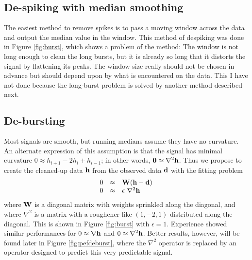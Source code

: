\subsection{De-spiking with median smoothing}

The easiest method to remove spikes is to pass a moving window
across the data and output the median value in the window.
This method of despiking was done in Figure \ref{fig:burst},
which shows a problem of the method:
The window is not long enough to clean the long bursts,
but it is already so long
that it distorts the signal by flattening its peaks.
The window size really should not be chosen in advance
but should depend upon by what is encountered on the data.
This I have not done
because the long-burst problem is solved
by another method described next.

\subsection{De-bursting}
Most signals are smooth, but running medians assume they have no curvature.
An alternate expression of this assumption is that the signal
has minimal curvature
$ 0 \approx h_{i+1} -2 h_{i} + h_{i-1} $;
in other words,
$ \bold 0 \approx \nabla^2 \bold h$.
Thus we propose to create the cleaned-up data $\bold h$
from the observed data $\bold d$ with the fitting problem
\begin{equation}
  \begin{array}{lll}
        0 &\approx & \bold W  (\bold h - \bold d)                       \\
        0 &\approx & \epsilon\  \nabla^2   \bold h
  \end{array}
\end{equation}
where $\bold W$ is a diagonal matrix with weights sprinkled along the diagonal,
and where $\nabla^2$ is a matrix
with a roughener like $(1,-2,1)$ distributed along the diagonal.
This is shown in Figure \ref{fig:burst} with $\epsilon = 1$.
Experience showed similar performances
for $0 \approx \nabla \bold h$ and $0 \approx \nabla^2 \bold h$.
Better results, however, will be found later in Figure
\ref{fig:pefdeburst},
where the $\nabla^2$ operator is replaced
by an operator designed to predict this very predictable signal.


